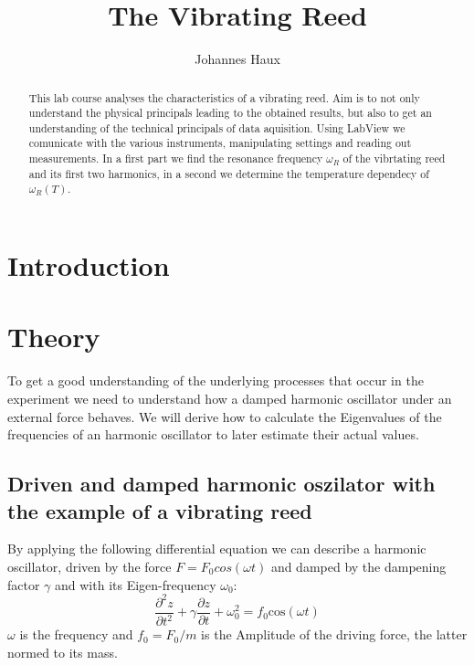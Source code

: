 \documentclass[a4paper,12pt]{article}
\title{The Vibrating Reed}
\author{Johannes Haux}
\begin{document}
\maketitle

\begin{abstract}
This lab course analyses the characteristics of a vibrating reed. Aim is to not only understand the physical 
principals leading to the obtained results, but also to get an understanding of the technical principals of 
data aquisition. Using LabView we comunicate with the various instruments, manipulating settings and reading out measurements. 
In a first part we find the resonance frequency $\omega_R$ of the vibrtating reed and its first two harmonics, in a 
second we determine the temperature dependecy of $\omega_R(T)$.
\end{abstract}
\vspace{2em}


\section{Introduction}
\label{sec:intro}

\section{Theory}
\label{sec:theo}

To get a good understanding of the underlying processes that occur in the experiment we need to understand how a damped harmonic
oscillator under an external force behaves. We will derive how to calculate the Eigenvalues of the frequencies of an harmonic oscillator to later
estimate their actual values.

\subsection{Driven and damped harmonic oszilator with the example of a vibrating reed}
\label{sec:osz}
By applying the following differential equation we can describe a harmonic oscillator, driven by the force $F = F_0 cos(\omega t)$ and damped by the dampening factor $\gamma$ and with its Eigen-frequency $\omega_0$:
\begin{equation}
 \frac{\partial^2z}{\partial t^2} + \gamma \frac{\partial z}{\partial t} + \omega_0^2 = f_0 \mathrm{cos}(\omega t)
 \label{eq:stAmp}
\end{equation}
$\omega$ is the frequency and $f_0 = F_0/m$ is the Amplitude of the driving force, the latter normed to its mass. 
\end{document}
